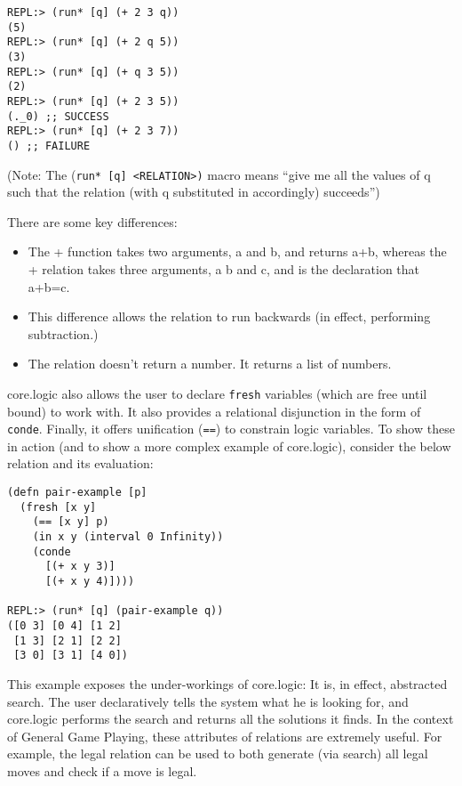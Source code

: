 \documentclass[letterpaper]{article}
\begin{document}
\begin{lstlisting}[frame=single, caption=The + relation]
REPL:> (run* [q] (+ 2 3 q))
(5)
REPL:> (run* [q] (+ 2 q 5))
(3)
REPL:> (run* [q] (+ q 3 5))
(2)
REPL:> (run* [q] (+ 2 3 5))
(._0) ;; SUCCESS
REPL:> (run* [q] (+ 2 3 7))
() ;; FAILURE
\end{lstlisting}

(Note: The (\texttt{run* [q] \textless RELATION\textgreater)} macro means ``give me all the values of q such that the relation (with q substituted in accordingly) succeeds'')

There are some key differences:
\begin{itemize}
\item The + function takes two arguments, a and b, and returns a+b, whereas the + relation takes three arguments, a b and c, and is the declaration that a+b=c.
\item This difference allows the relation to run backwards (in effect, performing subtraction.)
\item The relation doesn't return a number. It returns a list of numbers.
\end{itemize}

core.logic also allows the user to declare \texttt{fresh} variables (which are free until bound) to work with. It also provides a relational disjunction in the form of \texttt{conde}. Finally, it offers unification (\texttt{==}) to constrain logic variables. To show these in action (and to show a more complex example of core.logic), consider the below relation and its evaluation:

\begin{lstlisting}[frame=single, caption=Relation to generate all pairs of whole numbers (x y) such that x+y equals 3 or 4]
(defn pair-example [p]
  (fresh [x y]
    (== [x y] p)
    (in x y (interval 0 Infinity))
    (conde
      [(+ x y 3)]
      [(+ x y 4)])))

REPL:> (run* [q] (pair-example q))
([0 3] [0 4] [1 2]
 [1 3] [2 1] [2 2]
 [3 0] [3 1] [4 0])
\end{lstlisting}

This example exposes the under-workings of core.logic: It is, in effect, abstracted search. The user declaratively tells the system what he is looking for, and core.logic performs the search and returns all the solutions it finds. In the context of General Game Playing, these attributes of relations are extremely useful. For example, the legal relation can be used to both generate (via search) all legal moves and check if a move is legal.
\end{document}
